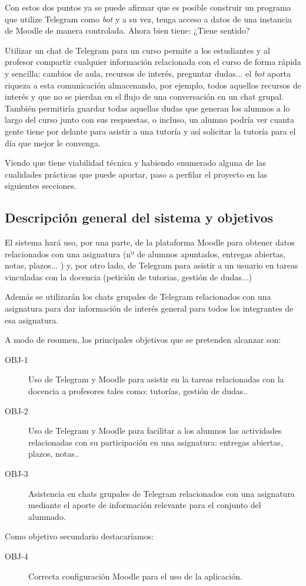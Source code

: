 Con estos dos puntos ya se puede afirmar que es posible construir un programa que utilize Telegram como \textit{bot} y a su vez, tenga acceso a datos de una instancia de Moodle de manera controlada. Ahora bien tiene: ¿Tiene sentido?

Utilizar un chat de Telegram para un curso permite a los estudiantes y al profesor compartir cualquier información relacionada con el curso de forma rápida y sencilla: cambios de aula, recursos de interés, preguntar dudas... el \textit{bot} aporta riqueza a esta comunicación  almacenando, por ejemplo, todos aquellos recursos de interés y que no se pierdan en el flujo de una conversación en un chat grupal. También  permitiría guardar todas aquellas dudas que generan los alumnos a lo largo del curso junto con sus respuestas, o incluso, un alumno podría ver cuanta gente tiene por delante para asistir a una tutoría y así solicitar la tutoría para el día que mejor le convenga.

Viendo que tiene viabilidad técnica y habiendo enumerado alguna de las cualidades prácticas que puede aportar, paso a perfilar el proyecto en las siguientes secciones.


\subsection{Descripción general del sistema y objetivos}

El sistema hará uso, por una parte, de la plataforma  Moodle para obtener datos relacionados con una asignatura (nº de alumnos apuntados, entregas abiertas, notas, plazos... ) y, por otro lado, de Telegram para asistir a un usuario en tareas vinculadas con la docencia (petición de tutorias, gestión de  dudas...) 

Además se utilizarán los chats grupales de Telegram relacionados  con una asignatura para dar información de interés general para todos los integrantes de esa asignatura.

A modo de resumen, los principales objetivos que se pretenden alcanzar son:

\begin{description}
\item[OBJ-1] Uso de Telegram y Moodle para asistir en la tareas relacionadas con la docencia a profesores tales como: tutorías, gestión de dudas.. \newline

\item[OBJ-2] Uso de Telegram y Moodle para facilitar a los alumnos las actividades relacionadas con su participación en una asignatura: entregas abiertas, plazos, notas.. \newline

\item[OBJ-3] Asistencia en chats grupales de Telegram relacionados con una asignatura mediante el aporte de información relevante para el conjunto del alumnado.
\end{description}


Como objetivo secundario destacaríamos:


\begin{description}
\item[OBJ-4] Correcta configuración Moodle para el uso de la aplicación. \newline
\end{description}


